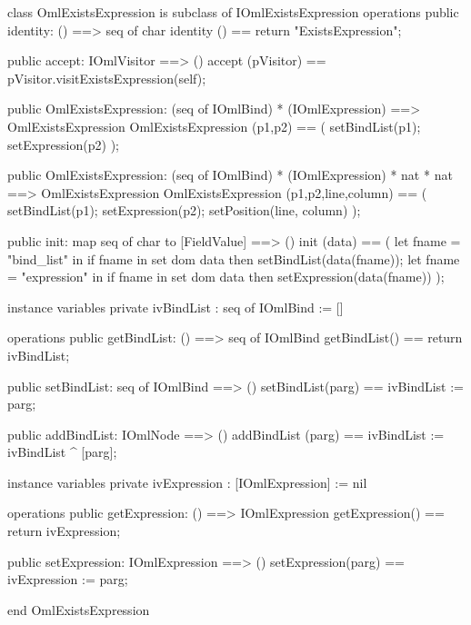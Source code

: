 \begin{vdm_al}
class OmlExistsExpression is subclass of IOmlExistsExpression
operations
  public identity: () ==> seq of char
  identity () == return "ExistsExpression";

  public accept: IOmlVisitor ==> ()
  accept (pVisitor) == pVisitor.visitExistsExpression(self);

  public OmlExistsExpression:
    (seq of IOmlBind) *
    (IOmlExpression) ==> OmlExistsExpression
  OmlExistsExpression (p1,p2) == 
    ( setBindList(p1);
      setExpression(p2) );

  public OmlExistsExpression:
    (seq of IOmlBind) *
    (IOmlExpression) *
    nat *
    nat ==> OmlExistsExpression
  OmlExistsExpression (p1,p2,line,column) == 
    ( setBindList(p1);
      setExpression(p2);
      setPosition(line, column) );

  public init: map seq of char to [FieldValue] ==> ()
  init (data) ==
    ( let fname = "bind_list" in
        if fname in set dom data
        then setBindList(data(fname));
      let fname = "expression" in
        if fname in set dom data
        then setExpression(data(fname)) );

instance variables
  private ivBindList : seq of IOmlBind := []

operations
  public getBindList: () ==> seq of IOmlBind
  getBindList() == return ivBindList;

  public setBindList: seq of IOmlBind ==> ()
  setBindList(parg) == ivBindList := parg;

  public addBindList: IOmlNode ==> ()
  addBindList (parg) == ivBindList := ivBindList ^ [parg];

instance variables
  private ivExpression : [IOmlExpression] := nil

operations
  public getExpression: () ==> IOmlExpression
  getExpression() == return ivExpression;

  public setExpression: IOmlExpression ==> ()
  setExpression(parg) == ivExpression := parg;

end OmlExistsExpression
\end{vdm_al}

